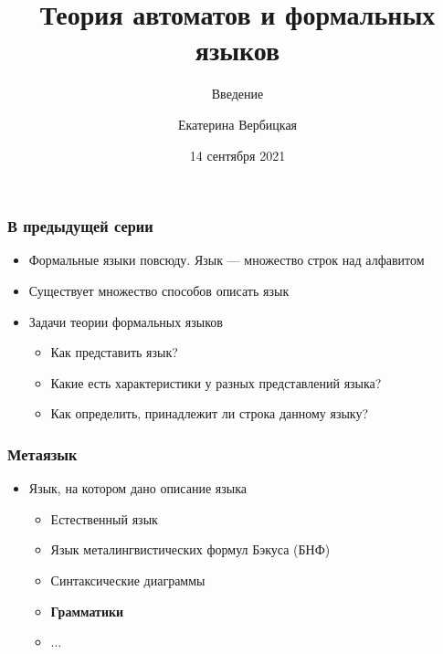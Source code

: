 \documentclass{beamer}
\title[]{Теория автоматов и формальных языков}
\subtitle[]{Введение}
\institute[]{
Санкт-Петербургский государственный электротехнический университет <<ЛЭТИ>>\\
}
\author[]{Екатерина Вербицкая}
\date{14 сентября 2021}
\begin{document}
{
  \begin{frame}
    \titlepage
  \end{frame}
}

\begin{frame}[fragile]
  \transwipe[direction=90]
  \frametitle{В предыдущей серии}
  \begin{itemize}
    \item Формальные языки повсюду. Язык --- множество строк над алфавитом
    \item Существует множество способов описать язык
    \item Задачи теории формальных языков
    \begin{itemize}
      \item Как представить язык?
      \item Какие есть характеристики у разных представлений языка?
      \item Как определить, принадлежит ли строка данному языку?
    \end{itemize}
  \end{itemize}
\end{frame}

\begin{frame}[fragile]
  \transwipe[direction=90]
  \frametitle{Метаязык}
  \begin{itemize}
    \item Язык, на котором дано описание языка
    \begin{itemize}
      \item Естественный язык
      \item Язык металингвистических формул Бэкуса (БНФ)
      \item Синтаксические диаграммы
      \item \textbf{Грамматики}
      \item $\dots$
    \end{itemize}
  \end{itemize}
\end{frame}
\end{document}
